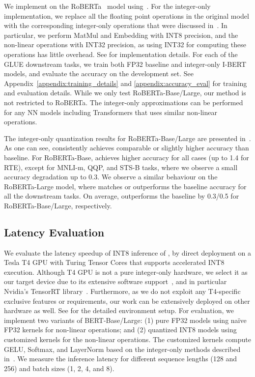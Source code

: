 We implement \OURS on the RoBERTa~\cite{liu2019roberta} model using~\cite{ott2019fairseq}.
For the integer-only implementation, we replace all the floating point operations in the original
model with the corresponding integer-only operations that were discussed in~.
In particular, we perform MatMul and Embedding with INT8 precision, and the non-linear operations with INT32 precision, as using INT32 for computing these operations has little overhead. 
See  for implementation details.
For each of the GLUE downstream tasks, we train both FP32 baseline and integer-only I-BERT models, and evaluate the accuracy on the development set.
See Appendix~\ref{appendix:training_details} and \ref{appendix:accuracy_eval} for training and evaluation details.
While we only test RoBERTa-Base/Large, our method is not restricted to RoBERTa.
The integer-only approximations can be performed for any NN models including Transformers that uses similar non-linear operations.



The integer-only quantization results for RoBERTa-Base/Large are presented in~. 
As one can see, \OURS consistently achieves comparable or slightly higher accuracy than baseline. 
For RoBERTa-Base, \OURS
achieves higher accuracy for all cases (up to 1.4 for RTE), except for MNLI-m, QQP, and STS-B tasks, where we observe a small
accuracy degradation up to 0.3.
We observe a similar behaviour on the RoBERTa-Large model, where \OURS matches or outperforms the baseline accuracy for all the downstream tasks.
On average, \OURS outperforms the baseline by 0.3/0.5 for RoBERTa-Base/Large, respectively.




\subsection{\textbf{Latency Evaluation}}
\label{subsection:latency_eval}

We evaluate the latency speedup of INT8 inference of \OURS, by direct deployment on
a Tesla T4 GPU with Turing Tensor Cores that supports accelerated INT8 execution.
Although T4 GPU is not a pure integer-only hardware, we select it as our target device due to its extensive software support~\cite{tensorrt, chen2018tvm}, and in
particular Nvidia's TensorRT library~\cite{tensorrt}.
Furthermore, as we do not exploit any T4-specific exclusive features or requirements, our work can be extensively deployed on other hardware as well.
See  for the detailed environment setup.
For evaluation, we implement two variants of BERT-Base/Large: (1) pure FP32 models using na\"ive FP32 kernels for non-linear operations; and (2) quantized INT8 models using customized kernels for the non-linear operations.
The customized kernels compute GELU, Softmax, and LayerNorm based on the integer-only methods described in~.
We measure the inference latency for different sequence lengths (128 and 256) and batch sizes (1, 2, 4, and 8). 
    
